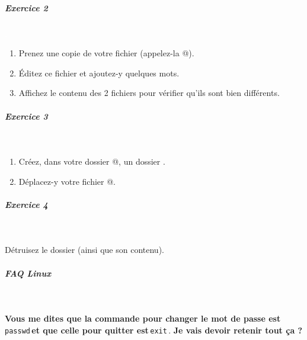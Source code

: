 \documentclass[11pt,a4paper]{article}
\begin{document}
            \par
        
			
		\subparagraph{Exercice 2} 
		
					\textcolor{white}{.} \par
				
            \par
        
					\begin{enumerate}
				
			\item 
						Prenez une copie de votre fichier \verb@test@ 
						(appelez-la @).
					
			\item \'Editez ce fichier et ajoutez-y quelques mots.
			\item Affichez le contenu des 2 fichiers pour v\'erifier qu'ils sont bien diff\'erents.
					\end{enumerate}
				
			
		\subparagraph{Exercice 3} 
		
					\textcolor{white}{.} \par
				
            \par
        
					\begin{enumerate}
				
			\item 
						Cr\'eez, dans votre dossier @,
						un dossier \verb@monDossier@.
					
			\item 
						D\'eplacez-y votre fichier @.
					
					\end{enumerate}
				
			
		\subparagraph{Exercice 4} 
		
					\textcolor{white}{.} \par
				
					D\'etruisez le dossier \verb@monDossier@
					(ainsi que son contenu).
				
            \par
        \clearpage
			
		\subparagraph{FAQ Linux} 
		
					\textcolor{white}{.} \par
				
            \par
        \textbf{Vous me dites que la commande pour changer le mot de passe est}\,\verb|passwd|\,\textbf{et que celle pour quitter est}\,\verb|exit|\,.
					\textbf{Je vais devoir retenir tout \c ca ?}
            \par
        
\end{document}
